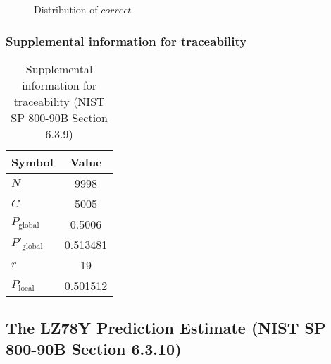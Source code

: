 \documentclass[a3paper,xelatex,english]{bxjsarticle}
\begin{document}
\begin{figure}[htbp]
\centering

\caption{Distribution of $correct$}
\end{figure}
\subsubsection{Supplemental information for traceability}
\renewcommand{\arraystretch}{1.8}
\begin{table}[h]
\caption{Supplemental information for traceability (NIST SP 800-90B Section 6.3.9)}
\begin{center}
\begin{tabular}{|l|c|}
\hline 
\rowcolor{anotherlightblue} %
Symbol				& Value \\ \hline 
$N$				& 9998\\ \hline 
$C$				& 5005\\ \hline 
$P_{\textrm{global}}$				&   0.5006\\ \hline 
$P'_{\textrm{global}}$			& 0.513481\\ \hline 
$r$				& 19\\ \hline 
$P_{\textrm{local}}$ 			& 0.501512\\ \hline
\end{tabular}
\end{center}
\end{table}
\renewcommand{\arraystretch}{1.4}
\clearpage
\subsection{The LZ78Y Prediction Estimate (NIST SP 800-90B Section 6.3.10)}\label{sec:Binary6310}
\end{document}
